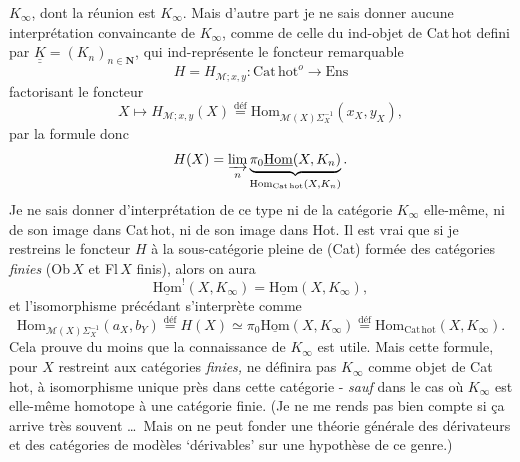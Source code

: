 \documentclass[11pt]{article}
\newcommand{\printedpage}[1]{\marginpar{\footnotesize p.~#1}}
\newcommand{\msp}[1]{\marginpar{\footnotesize [#1]}}
\newcommand{\uHom}{\underline{\mathrm{Hom}}}
\newcommand{\Hom}{\mathrm{Hom}}
\newcommand{\defeq}{\overset{\text{déf}}{=}}
\newcommand{\Cathot}{\mathrm{Cat\,hot}}
\newcommand{\Ens}{\mathrm{Ens}}
\newcommand{\uuK}{\underline{\underline{K}}}
\begin{document}
\printedpage{29}
$K_\infty$, dont la réunion est $K_\infty$. Mais d'autre part je ne sais donner aucune interprétation convaincante de $K_\infty$, comme de celle du ind-objet de Cat\,hot defini par $\uuK = (K_n)_{n\in\mathbf{N}}$, qui ind-représente le foncteur remarquable %
\[
H = H_{\mathcal{M};x,y} : \Cathot^{o} \longrightarrow \Ens
\]
factorisant le foncteur
\msp{page 45}
\[
X \longmapsto H_{\mathcal{M};x,y}(X) \defeq \Hom_{\mathcal{M}(X)\Sigma_X^{-1}}(x_X, y_X),
\]
par la formule donc
\[
H(X) = \varinjlim_{n} \underbrace{\pi_0\uHom(X, K_n)}_{\Hom_{\Cathot}(X,K_n)} .
\]
Je ne sais donner d'interprétation de ce type ni de la catégorie $K_\infty$ elle-même, ni de son image dans Cat\,hot, ni de son image dans Hot. Il est vrai que si je restreins le foncteur $H$ à la sous-catégorie pleine de (Cat) formée des catégories \textit{finies} (Ob\,$X$ et Fl\,$X$ finis), alors on aura
\[
\uHom^{!}(X, K_\infty) = \uHom(X, K_\infty),
\]
et l'isomorphisme précédant s'interprète comme %
\[
\Hom_{\mathcal{M}(X)\Sigma_X^{-1}}(a_X, b_Y) \defeq H(X) \simeq \pi_0\uHom(X, K_\infty) \defeq \Hom_{\Cathot}(X, K_\infty).
\]
 Cela prouve du moins que la connaissance de $K_\infty$ est utile. Mais cette formule, pour $X$ restreint aux catégories \textit{finies,} ne définira pas $K_\infty$ comme objet de Cat\,hot, à isomorphisme unique près dans cette catégorie - \textit{sauf} dans le cas où $K_\infty$ est elle-même homotope à une catégorie
\msp{page 46}
finie. (Je ne me rends pas bien compte si ça arrive très souvent \ldots\ Mais on ne peut fonder une théorie générale des dérivateurs et des catégories de modèles `dérivables' sur une hypothèse de ce genre.)
\end{document}
